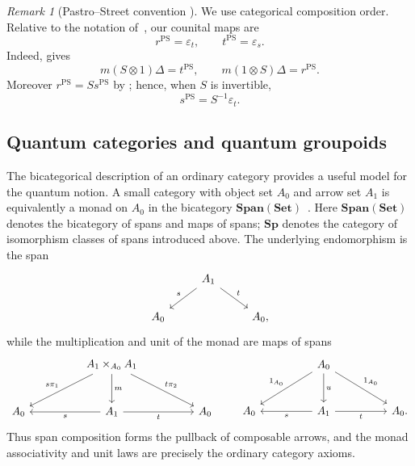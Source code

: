 \documentclass[oneside]{article}
\newcommand{\Sp}{\mathbf{Sp}}
\newcommand{\Span}{\mathbf{Span}}
\theoremstyle{plain}
\theoremstyle{definition}
\theoremstyle{remark}
\newtheorem{remark}[theorem]{Remark}
\begin{document}
\begin{remark}[Pastro--Street convention
{\cite[\S2.1, Def.~2.1 and Prop.~2.3(15)]{PastroStreet2009}}]
\label{rem:cgqg-ps-convention}
    We use categorical composition order. Relative to the notation of~\cite{PastroStreet2009}, our counital maps are
    \begin{equation}
        r^{\mathrm{PS}}=\varepsilon_t,
        \qquad
        t^{\mathrm{PS}}=\varepsilon_s.
        \label{eq:cgqg-ps-an-convention-bridge}
    \end{equation}
    Indeed, \cite[Def~2.1]{PastroStreet2009} gives
    \[
        m(S\otimes1)\Delta=t^{\mathrm{PS}},
        \qquad
        m(1\otimes S)\Delta=r^{\mathrm{PS}}.
    \]
    Moreover \(r^{\mathrm{PS}}=S s^{\mathrm{PS}}\) by \cite[Prop.~2.3(15)]{PastroStreet2009}; hence, when \(S\) is invertible,
    \[
        s^{\mathrm{PS}}=S^{-1}\varepsilon_t.
    \]
\end{remark}

\subsection{Quantum categories and quantum groupoids}

The bicategorical description of an ordinary category provides a useful model for the quantum notion. A small category with object set \(A_0\) and arrow set \(A_1\) is equivalently a monad on \(A_0\) in the bicategory \(\Span(\mathbf{Set})\)~\cite[Example~2.3]{McCrudden2002}. Here \(\Span(\mathbf{Set})\) denotes the bicategory of spans and maps of spans; \(\Sp\) denotes the category of isomorphism classes of spans introduced above. The underlying endomorphism is the span
\begin{equation*}
    \begin{tikzcd}
        & A_1
            \arrow[dl,"s"']
            \arrow[dr,"t"]
        & \\
        A_0 && A_0,
    \end{tikzcd}
\end{equation*}
while the multiplication and unit of the monad are maps of spans
\begin{equation*}
    \begin{tikzcd}[column sep=huge,row sep=large]
        &
        A_1\times_{A_0} A_1
            \arrow[dl,"s\pi_1"']
            \arrow[d,"m"]
            \arrow[dr,"t\pi_2"]
        &
        \\
        A_0
        &
        A_1
            \arrow[l,"s"]
            \arrow[r,"t"']
        &
        A_0
    \end{tikzcd}
    \qquad
    \begin{tikzcd}[column sep=huge,row sep=large]
        &
        A_0
            \arrow[dl,"1_{A_0}"']
            \arrow[d,"u"]
            \arrow[dr,"1_{A_0}"]
        &
        \\
        A_0
        &
        A_1
            \arrow[l,"s"]
            \arrow[r,"t"']
        &
        A_0 .
    \end{tikzcd}
\end{equation*}
Thus span composition forms the pullback of composable arrows, and the monad
associativity and unit laws are precisely the ordinary category axioms.
\end{document}
